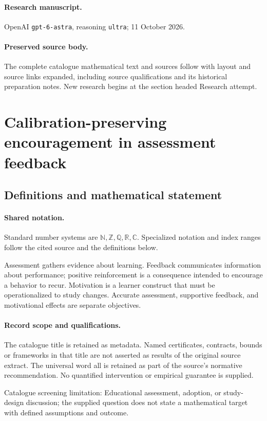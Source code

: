 \documentclass[11pt]{article}
\begin{document}
\paragraph{Research manuscript.} OpenAI \texttt{gpt-6-astra}, reasoning \texttt{ultra}; 11 October 2026.
\paragraph{Preserved source body.} The complete catalogue mathematical text and sources follow with layout and source links expanded, including source qualifications and its historical preparation notes. New research begins at the section headed Research attempt.

\section{Calibration-preserving encouragement in assessment feedback}\label{statement}

\subsection{Definitions and mathematical statement}

\paragraph{Shared notation.}Standard number systems are $\mathbb N,\mathbb Z,\mathbb Q,\mathbb R,\mathbb C$. Specialized notation and index ranges follow the cited source and the definitions below.


Assessment gathers evidence about learning. Feedback communicates information about performance; positive reinforcement is a consequence intended to encourage a behavior to recur. Motivation is a learner construct that must be operationalized to study changes. Accurate assessment, supportive feedback, and motivational effects are separate objectives.
\paragraph{Record scope and qualifications.}
The catalogue title is retained as metadata. Named certificates, contracts, bounds or frameworks in that title are not asserted as results of the original source extract.
The universal word all is retained as part of the source's normative recommendation. No quantified intervention or empirical guarantee is supplied.

Catalogue screening limitation: Educational assessment, adoption, or study-design discussion; the supplied question does not state a mathematical target with defined assumptions and outcome.
\end{document}
